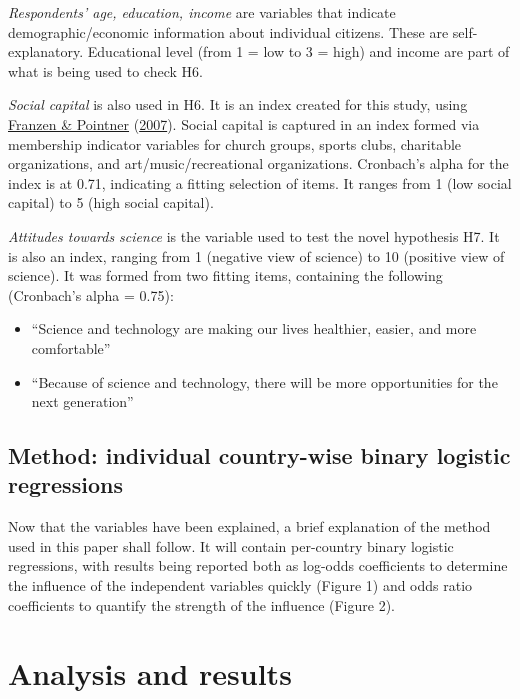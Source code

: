 \documentclass[
  12pt,
  english,
]{article}
\providecommand{\tightlist}{%
  \setlength{\itemsep}{0pt}\setlength{\parskip}{0pt}}
\begin{document}
\emph{Respondents' age, education, income} are variables that indicate
demographic/economic information about individual citizens. These are
self-explanatory. Educational level (from 1 = low to 3 = high) and
income are part of what is being used to check H6.

\emph{Social capital} is also used in H6. It is an index created for
this study, using
\protect\hyperlink{ref-franzen2007sozialkapital}{Franzen \& Pointner}
(\protect\hyperlink{ref-franzen2007sozialkapital}{2007}). Social capital
is captured in an index formed via membership indicator variables for
church groups, sports clubs, charitable organizations, and
art/music/recreational organizations. Cronbach's alpha for the index is
at 0.71, indicating a fitting selection of items. It ranges from 1 (low
social capital) to 5 (high social capital).

\emph{Attitudes towards science} is the variable used to test the novel
hypothesis H7. It is also an index, ranging from 1 (negative view of
science) to 10 (positive view of science). It was formed from two
fitting items, containing the following (Cronbach's alpha = 0.75):

\begin{itemize}
\tightlist
\item
  ``Science and technology are making our lives healthier, easier, and
  more comfortable''
\item
  ``Because of science and technology, there will be more opportunities
  for the next generation''
\end{itemize}

\hypertarget{method-individual-country-wise-binary-logistic-regressions}{%
\subsection{Method: individual country-wise binary logistic
regressions}\label{method-individual-country-wise-binary-logistic-regressions}}

Now that the variables have been explained, a brief explanation of the
method used in this paper shall follow. It will contain per-country
binary logistic regressions, with results being reported both as
log-odds coefficients to determine the influence of the independent
variables quickly (Figure 1) and odds ratio coefficients to quantify the
strength of the influence (Figure 2).

\hypertarget{analysis-and-results}{%
\section{Analysis and results}\label{analysis-and-results}}
\end{document}
